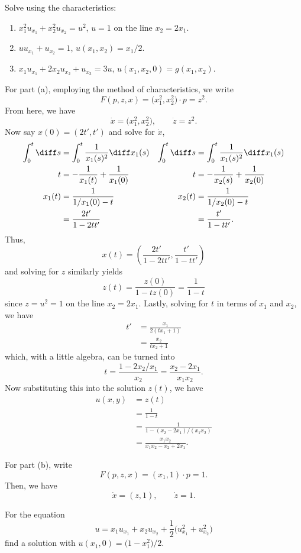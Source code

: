 \begin{problem}
  Solve using the characteristics:
  \begin{enumerate}[label=(\alph*)]
  \item \(x_1^2u_{x_1}+x_2^2u_{x_2}=u^2\), \(u=1\) on the line
    \(x_2=2x_1\).
  \item \(uu_{x_1}+u_{x_2}=1\), \(u(x_1,x_2)=x_1/2\).
  \item \(x_1u_{x_1}+2x_2u_{x_2}+u_{x_3}=3u\),
    \(u(x_1,x_2,0)=g(x_1,x_2)\).
  \end{enumerate}
\end{problem}
\begin{solution}
  For part (a), employing the method of characteristics, we write
  \[
    F(p,z,x)=\bigl(x_1^2,x_2^2\bigr)\cdot p=z^2.
  \]
  From here, we have
  \[
    \dot x=\bigl(x_1^2,x_2^2\bigr),\qquad
    \dot z= z^2.
  \]
  Now say \(x(0)=(2t',t')\) and solve for \(\dot x\),
  \begin{align*}
    \int_0^{t}\diff s&=\int_0^t\frac{1}{x_1(s)^2}\diff x_1(s)
    &\int_0^t\diff s&=\int_0^t\frac{1}{x_1(s)^2}\diff x_1(s)\\
    t&=-\frac{1}{x_1(t)}+\frac{1}{x_1(0)}
    &t&=-\frac{1}{x_2(s)}+\frac{1}{x_2(0)}\\
    x_1(t)&=\frac{1}{1/x_1(0)-t}
    &x_2(t)&=\frac{1}{1/x_2(0)-t}\\
    &=\frac{2t'}{1-2tt'}&
    &=\frac{t'}{1-tt'}.
  \end{align*}
  Thus,
  \[
    x(t)=\left(\frac{2t'}{1-2tt'},\frac{t'}{1-tt'}\right)
  \]
  and solving for \(z\) similarly yields
  \[
    z(t)=\frac{z(0)}{1-tz(0)}=\frac{1}{1-t}
  \]
  since \(z=u^2=1\) on the line \(x_2=2x_1\). Lastly, solving for \(t\) in
  terms of \(x_1\) and \(x_2\), we have
  \begin{align*}
    t'&=\frac{x_1}{2(tx_1+1)}\\
      &=\frac{x_2}{tx_2+1}
  \end{align*}
  which, with a little algebra, can be turned into
  \[
    t=\frac{1-2x_2/x_1}{x_2}=\frac{x_2-2x_1}{x_1x_2}.
  \]
  Now substituting this into the solution \(z(t)\), we have
  \begin{align*}
    u(x,y)&=z(t)\\
          &=\frac{1}{1-t}\\
          &=\frac{1}{1-(x_2-2x_1)/(x_1x_2)}\\
          &=\frac{x_1x_2}{x_1x_2-x_2+2x_1}.
  \end{align*}

  For part (b), write
  \[
    F(p,z,x)=(x_1,1)\cdot p=1.
  \]
  Then, we have
  \[
    \dot x=(z,1),\qquad\dot z=1.
  \]
\end{solution}
\newpage

\begin{problem}
  For the equation
  \[
    u=x_1u_{x_1}+x_2u_{x_2}
    +\frac{1}{2}\bigl(u_{x_1}^2+u_{x_2}^2\bigr)
  \]
  find a solution with \(u(x_1,0)=\bigl(1-x_1^2\bigr)/2\).
\end{problem}
\begin{solution}

\end{solution}

